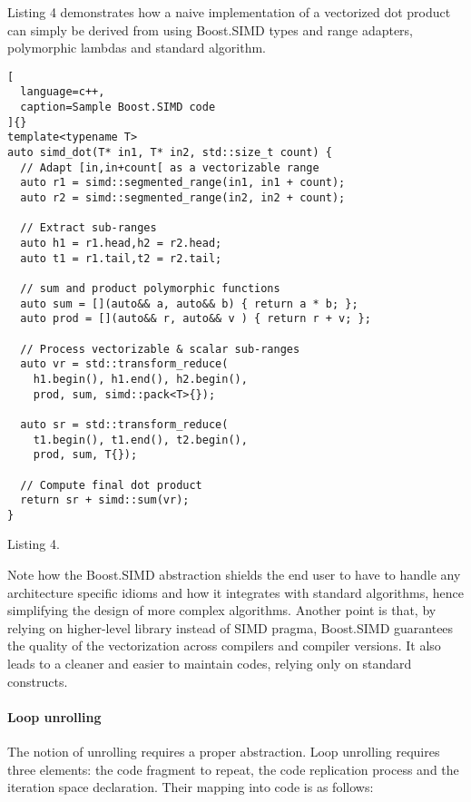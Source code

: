 \documentclass[../../main.tex]{subfiles}
\begin{document}
Listing 4 demonstrates how a naive implementation of a
vectorized dot product can simply be derived from using
Boost.SIMD types and range adapters, polymorphic
lambdas and standard algorithm.

\begin{lstlisting}[
  language=c++,
  caption=Sample Boost.SIMD code
]{}
template<typename T>
auto simd_dot(T* in1, T* in2, std::size_t count) {
  // Adapt [in,in+count[ as a vectorizable range
  auto r1 = simd::segmented_range(in1, in1 + count);
  auto r2 = simd::segmented_range(in2, in2 + count);

  // Extract sub-ranges
  auto h1 = r1.head,h2 = r2.head;
  auto t1 = r1.tail,t2 = r2.tail;

  // sum and product polymorphic functions
  auto sum = [](auto&& a, auto&& b) { return a * b; };
  auto prod = [](auto&& r, auto&& v ) { return r + v; };

  // Process vectorizable & scalar sub-ranges
  auto vr = std::transform_reduce(
    h1.begin(), h1.end(), h2.begin(),
    prod, sum, simd::pack<T>{});

  auto sr = std::transform_reduce(
    t1.begin(), t1.end(), t2.begin(),
    prod, sum, T{});

  // Compute final dot product
  return sr + simd::sum(vr);
}
\end{lstlisting}
Listing 4.

Note how the Boost.SIMD abstraction shields the end
user to have to handle any architecture specific idioms
and how it integrates with standard algorithms, hence
simplifying the design of more complex algorithms.
Another point is that, by relying on higher-level library
instead of SIMD pragma, Boost.SIMD guarantees
the quality of the vectorization across compilers and
compiler versions. It also leads to a cleaner and easier to
maintain codes, relying only on standard \cpp constructs.

\paragraph{Loop unrolling} The notion of unrolling requires
a proper abstraction. Loop unrolling requires three
elements: the code fragment to repeat, the code
replication process and the iteration space declaration.
Their mapping into \cpp code is as follows:
\end{document}
